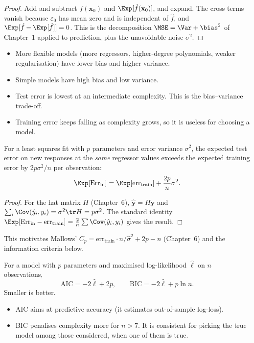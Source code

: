 \begin{proof}
Add and subtract $f(\mathbf{x}_0)$ and $\Exp[\hat{f}(\mathbf{x}_0)]$, and expand. The cross terms vanish because $\varepsilon_0$ has mean zero and is independent of $\hat{f}$, and $\Exp[\hat{f}-\Exp[\hat{f}]]=0$. This is the decomposition $\MSE=\Var+\bias^2$ of Chapter~1 applied to prediction, plus the unavoidable noise $\sigma^2$.
\end{proof}

\begin{itemize}
  \item More flexible models (more regressors, higher-degree polynomials, weaker regularisation) have lower bias and higher variance.
  \item Simple models have high bias and low variance.
  \item Test error is lowest at an intermediate complexity. This is the bias--variance trade-off.
  \item Training error keeps falling as complexity grows, so it is useless for choosing a model.
\end{itemize}

\begin{theorem}\label{thm:optimism}
For a least squares fit with $p$ parameters and error variance $\sigma^2$, the expected test error on new responses at the \emph{same} regressor values exceeds the expected training error by $2p\sigma^2/n$ per observation:
\[ \Exp[\mathrm{Err}_{\mathrm{in}}]=\Exp[\mathrm{err}_{\mathrm{train}}]+\frac{2p}n\sigma^2. \]
\end{theorem}

\begin{proof}
For the hat matrix $H$ (Chapter~6), $\hat{\mathbf{y}}=H\mathbf{y}$ and $\sum_i\Cov(\hat{y}_i,y_i)=\sigma^2\tr H=p\sigma^2$. The standard identity $\Exp[\mathrm{Err}_{\mathrm{in}}-\mathrm{err}_{\mathrm{train}}]=\frac2n\sum\Cov(\hat{y}_i,y_i)$ gives the result.
\end{proof}

This motivates Mallows' $C_p=\mathrm{err}_{\mathrm{train}}\cdot n/\hat\sigma^2+2p-n$ (Chapter~6) and the information criteria below.

\begin{definition}
For a model with $p$ parameters and maximised log-likelihood $\hat\ell$ on $n$ observations,
\[ \mathrm{AIC}=-2\hat\ell+2p,\qquad\mathrm{BIC}=-2\hat\ell+p\ln n. \]
Smaller is better.
\begin{itemize}
  \item AIC aims at predictive accuracy (it estimates out-of-sample log-loss).
  \item BIC penalises complexity more for $n>7$. It is consistent for picking the true model among those considered, when one of them is true.
\end{itemize}
\end{definition}

